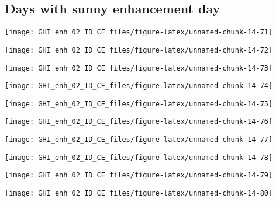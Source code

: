 \documentclass[
  10pt,
  a4paper,oneside]{article}
\begin{document}
\FloatBarrier

\hypertarget{days-with-sunny-enhancement-day}{%
\subsection{Days with sunny enhancement day}\label{days-with-sunny-enhancement-day}}

\begin{center}\texttt{[image: GHI\_enh\_02\_ID\_CE\_files/figure-latex/unnamed-chunk-14-71]} \end{center}

\begin{center}\texttt{[image: GHI\_enh\_02\_ID\_CE\_files/figure-latex/unnamed-chunk-14-72]} \end{center}

\begin{center}\texttt{[image: GHI\_enh\_02\_ID\_CE\_files/figure-latex/unnamed-chunk-14-73]} \end{center}

\begin{center}\texttt{[image: GHI\_enh\_02\_ID\_CE\_files/figure-latex/unnamed-chunk-14-74]} \end{center}

\begin{center}\texttt{[image: GHI\_enh\_02\_ID\_CE\_files/figure-latex/unnamed-chunk-14-75]} \end{center}

\begin{center}\texttt{[image: GHI\_enh\_02\_ID\_CE\_files/figure-latex/unnamed-chunk-14-76]} \end{center}

\begin{center}\texttt{[image: GHI\_enh\_02\_ID\_CE\_files/figure-latex/unnamed-chunk-14-77]} \end{center}

\begin{center}\texttt{[image: GHI\_enh\_02\_ID\_CE\_files/figure-latex/unnamed-chunk-14-78]} \end{center}

\begin{center}\texttt{[image: GHI\_enh\_02\_ID\_CE\_files/figure-latex/unnamed-chunk-14-79]} \end{center}

\begin{center}\texttt{[image: GHI\_enh\_02\_ID\_CE\_files/figure-latex/unnamed-chunk-14-80]} \end{center}
\end{document}
